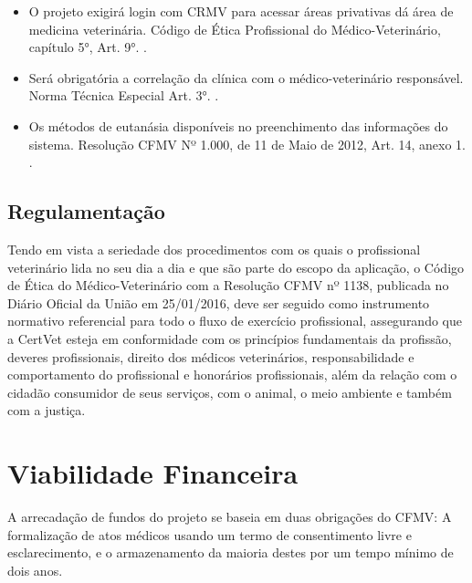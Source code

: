 \documentclass[
    12pt,               %
    openright,          %
    oneside,
    a4paper,            %
    BIBLATEX,           %
    TODO,               %
    english,            %
    brazil              %
    ]{ifsp-spo-inf-ctds}
\begin{document}
            \begin{itemize}
            
                \item O projeto exigirá login com CRMV para acessar áreas privativas dá área de medicina veterinária. Código de Ética Profissional do Médico-Veterinário, capítulo 5°, Art. 9°. .
                
                \item Será obrigatória a correlação da clínica com o médico-veterinário responsável. Norma Técnica Especial Art. 3°. .
                
                \item Os métodos de eutanásia disponíveis no preenchimento das informações do sistema. Resolução CFMV Nº 1.000, de 11 de Maio de 2012, Art. 14, anexo 1. .
                
            \end{itemize}            

        \subsection{Regulamentação}
        
            Tendo em vista a seriedade dos procedimentos com os quais o profissional veterinário lida no seu dia a dia e que são parte do escopo da aplicação, o Código de Ética do Médico-Veterinário com a Resolução CFMV nº 1138, publicada no Diário Oficial da União em 25/01/2016, deve ser seguido como instrumento normativo referencial para todo o fluxo de exercício profissional, assegurando que a CertVet esteja em conformidade com os princípios fundamentais da profissão, deveres profissionais, direito dos médicos veterinários, responsabilidade e comportamento do profissional e honorários profissionais, além da relação com o cidadão consumidor de seus serviços, com o animal, o meio ambiente e também com a justiça.  

    \section{Viabilidade Financeira}
    
        A arrecadação de fundos do projeto se baseia em duas obrigações do CFMV: A formalização de atos médicos usando um termo de consentimento livre e esclarecimento, e o armazenamento da maioria destes por um tempo mínimo de dois anos.
\end{document}
